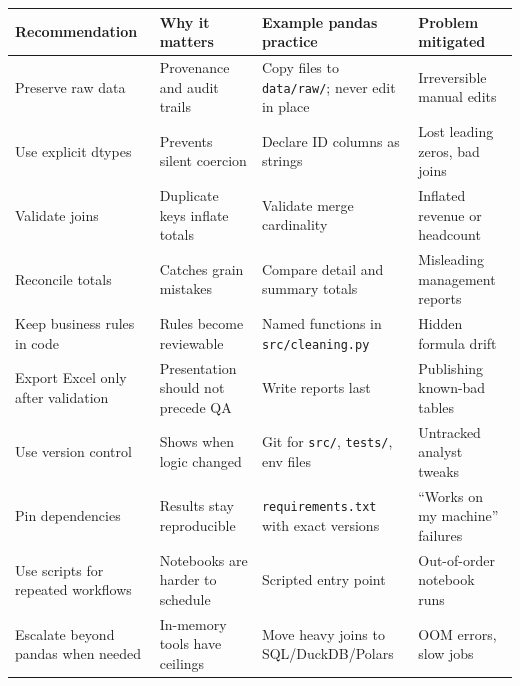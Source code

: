 \documentclass[
  12pt,
]{article}
\newcounter{none} %
\begin{document}
{\def\LTcaptype{none} %
\begin{longtable}[]{@{}
  >{\raggedright\arraybackslash}p{}
  >{\raggedright\arraybackslash}p{}
  >{\raggedright\arraybackslash}p{}
  >{\raggedright\arraybackslash}p{}@{}}
\toprule\noalign{}
\begin{minipage}[b]{\linewidth}\raggedright
Recommendation
\end{minipage} & \begin{minipage}[b]{\linewidth}\raggedright
Why it matters
\end{minipage} & \begin{minipage}[b]{\linewidth}\raggedright
Example pandas practice
\end{minipage} & \begin{minipage}[b]{\linewidth}\raggedright
Problem mitigated
\end{minipage} \\
\midrule\noalign{}
\endhead
\bottomrule\noalign{}
\endlastfoot
Preserve raw data & Provenance and audit trails & Copy files to
\texttt{data/raw/}; never edit in place & Irreversible manual edits \\
Use explicit dtypes & Prevents silent coercion & Declare ID columns as
strings & Lost leading zeros, bad joins \\
Validate joins & Duplicate keys inflate totals & Validate merge
cardinality & Inflated revenue or headcount \\
Reconcile totals & Catches grain mistakes & Compare detail and summary
totals & Misleading management reports \\
Keep business rules in code & Rules become reviewable & Named functions
in \texttt{src/cleaning.py} & Hidden formula drift \\
Export Excel only after validation & Presentation should not precede QA
& Write reports last & Publishing known-bad tables \\
Use version control & Shows when logic changed & Git for \texttt{src/},
\texttt{tests/}, env files & Untracked analyst tweaks \\
Pin dependencies & Results stay reproducible & \texttt{requirements.txt}
with exact versions & ``Works on my machine'' failures \\
Use scripts for repeated workflows & Notebooks are harder to schedule &
Scripted entry point & Out-of-order notebook runs \\
Escalate beyond pandas when needed & In-memory tools have ceilings &
Move heavy joins to SQL/DuckDB/Polars & OOM errors, slow jobs \\
\end{longtable}
}
\end{document}
